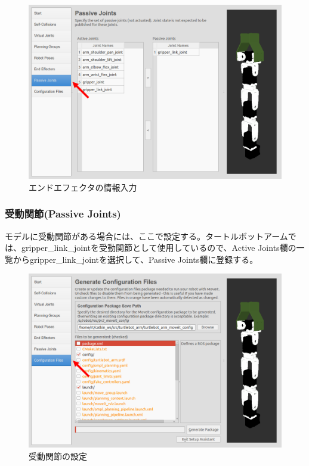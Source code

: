 \begin{figure}[ht]
  \centering
  \includegraphics[width=\columnwidth]{pictures/chapter11/pic_11_31.png}
  \caption{エンドエフェクタの情報入力}
\end{figure}

\subsubsection{受動関節(Passive Joints)}

モデルに受動関節がある場合には、ここで設定する。タートルボットアームでは、gripper\_link\_jointを受動関節として使用しているので、Active Joints欄の一覧からgripper\_link\_jointを選択して、Passive Joints欄に登録する。

\begin{figure}[ht]
  \centering
  \includegraphics[width=\columnwidth]{pictures/chapter11/pic_11_32.png}
  \caption{受動関節の設定}
\end{figure}

